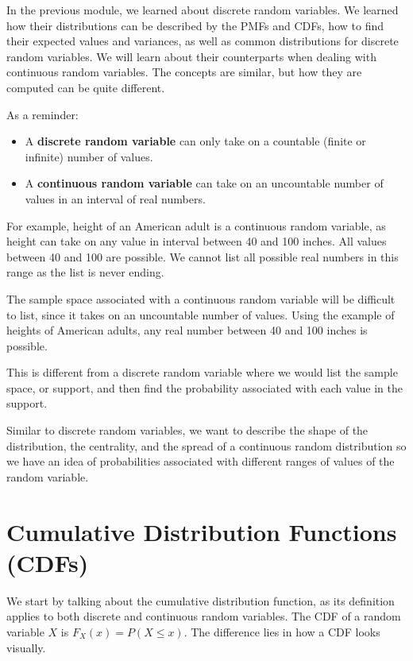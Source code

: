 \documentclass[
]{book}
\providecommand{\tightlist}{%
  \setlength{\itemsep}{0pt}\setlength{\parskip}{0pt}}
\begin{document}
In the previous module, we learned about discrete random variables. We learned how their distributions can be described by the PMFs and CDFs, how to find their expected values and variances, as well as common distributions for discrete random variables. We will learn about their counterparts when dealing with continuous random variables. The concepts are similar, but how they are computed can be quite different.

As a reminder:

\begin{itemize}
\tightlist
\item
  A \textbf{discrete random variable} can only take on a countable (finite or infinite) number of values.
\item
  A \textbf{continuous random variable} can take on an uncountable number of values in an interval of real numbers.
\end{itemize}

For example, height of an American adult is a continuous random variable, as height can take on any value in interval between 40 and 100 inches. All values between 40 and 100 are possible. We cannot list all possible real numbers in this range as the list is never ending.

The sample space associated with a continuous random variable will be difficult to list, since it takes on an uncountable number of values. Using the example of heights of American adults, any real number between 40 and 100 inches is possible.

This is different from a discrete random variable where we would list the sample space, or support, and then find the probability associated with each value in the support.

Similar to discrete random variables, we want to describe the shape of the distribution, the centrality, and the spread of a continuous random distribution so we have an idea of probabilities associated with different ranges of values of the random variable.

\section{Cumulative Distribution Functions (CDFs)}\label{cumulative-distribution-functions-cdfs-1}

We start by talking about the cumulative distribution function, as its definition applies to both discrete and continuous random variables. The CDF of a random variable \(X\) is \(F_X(x) = P(X \leq x)\). The difference lies in how a CDF looks visually.
\end{document}
